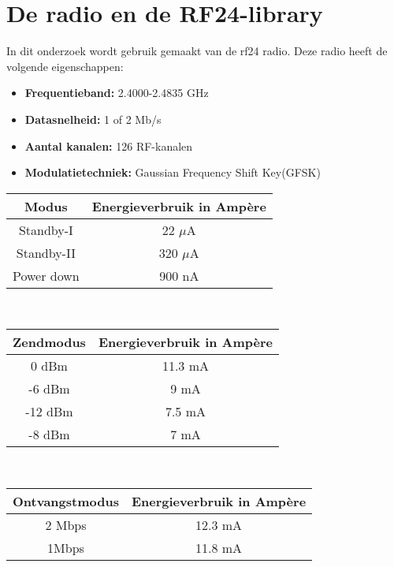 \documentclass{article}
\begin{document}
\section{De radio en de RF24-library}
In dit onderzoek wordt gebruik gemaakt van de rf24 radio. Deze radio heeft de volgende eigenschappen:
	\begin{itemize}	
	\item\textbf{Frequentieband: }2.4000-2.4835 GHz
	\item\textbf{Datasnelheid: }1 of 2 Mb/s
	\item\textbf{Aantal kanalen: }126 RF-kanalen
	\item\textbf{Modulatietechniek: }Gaussian Frequency Shift Key(GFSK)
	\end{itemize}
\begin{tabular}{c||c}
\textbf{Modus}  & \textbf{Energieverbruik in Amp\`ere}     \\
\hline
Standby-I   & 22 $\mu$A    \\
Standby-II  & 320 $\mu$A     \\
Power down  & 900 nA 
\end{tabular}\\
\begin{tabular}{c||c}
\textbf{Zendmodus}  & \textbf{Energieverbruik in Amp\`ere}     \\
\hline
0 dBm  & 11.3 mA    \\
-6 dBm & 9 mA     \\
-12 dBm & 7.5 mA  \\
-8 dBm & 7 mA
\end{tabular}\\
\begin{tabular}{c||c}
\textbf{Ontvangstmodus}  & \textbf{Energieverbruik in Amp\`ere}     \\
\hline
2 Mbps   & 12.3 mA    \\
1Mbps & 11.8 mA     
\end{tabular}
\end{document}
